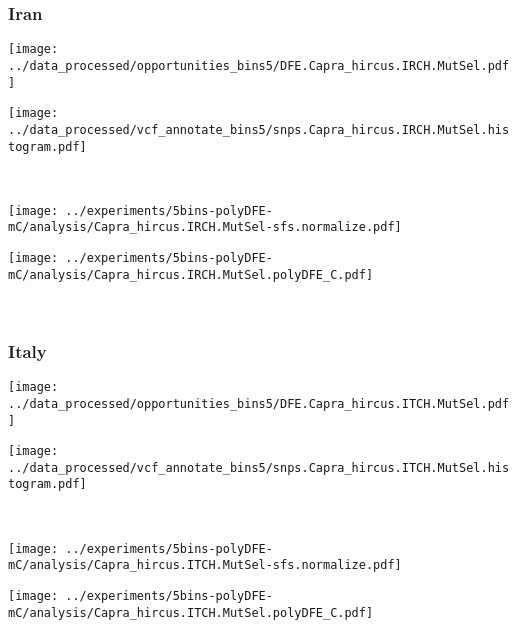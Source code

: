 \subsubsection{Iran}

\begin{minipage}{0.49\linewidth}
    \texttt{[image: ../data\_processed/opportunities\_bins5/DFE.Capra\_hircus.IRCH.MutSel.pdf]}
\end{minipage}
\begin{minipage}{0.49\linewidth}
    \texttt{[image: ../data\_processed/vcf\_annotate\_bins5/snps.Capra\_hircus.IRCH.MutSel.histogram.pdf]}
\end{minipage}
\\
\begin{minipage}{0.49\linewidth}
    \texttt{[image: ../experiments/5bins-polyDFE-mC/analysis/Capra\_hircus.IRCH.MutSel-sfs.normalize.pdf]}
\end{minipage}
\begin{minipage}{0.49\linewidth}
    \texttt{[image: ../experiments/5bins-polyDFE-mC/analysis/Capra\_hircus.IRCH.MutSel.polyDFE\_C.pdf]}
\end{minipage}
\\

\subsubsection{Italy}

\begin{minipage}{0.49\linewidth}
    \texttt{[image: ../data\_processed/opportunities\_bins5/DFE.Capra\_hircus.ITCH.MutSel.pdf]}
\end{minipage}
\begin{minipage}{0.49\linewidth}
    \texttt{[image: ../data\_processed/vcf\_annotate\_bins5/snps.Capra\_hircus.ITCH.MutSel.histogram.pdf]}
\end{minipage}
\\
\begin{minipage}{0.49\linewidth}
    \texttt{[image: ../experiments/5bins-polyDFE-mC/analysis/Capra\_hircus.ITCH.MutSel-sfs.normalize.pdf]}
\end{minipage}
\begin{minipage}{0.49\linewidth}
    \texttt{[image: ../experiments/5bins-polyDFE-mC/analysis/Capra\_hircus.ITCH.MutSel.polyDFE\_C.pdf]}
\end{minipage}
\\

